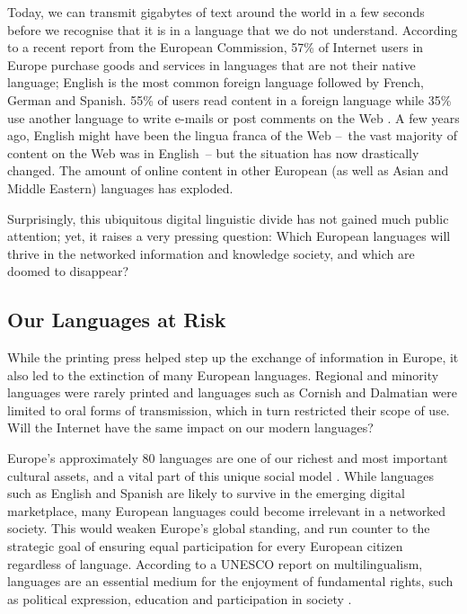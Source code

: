 \documentclass[]{../../metanetpaper}
\begin{document}
\begin{multicols}{2}
Today, we can transmit gigabytes of text around the world in a few seconds before we recognise that it is in a language that we do not understand. According to a recent report from the European Commission, 57\% of Internet users in Europe purchase goods and services in languages that are not their native language; English is the most common foreign language followed by French, German and Spanish. 55\% of users read content in a foreign language while 35\% use another language to write e-mails or post comments on the Web \cite{EC1}. A few years ago, English might have been the lingua franca of the Web --~the vast majority of content on the Web was in English~-- but the situation has now drastically changed. The amount of online content in other European (as well as Asian and Middle Eastern) languages has exploded.

Surprisingly, this ubiquitous digital linguistic divide has not gained much public attention; yet, it raises a very pressing question: Which European languages will thrive in the networked information and knowledge society, and which are doomed to disappear?

\subsection{Our Languages at Risk}

While the printing press helped step up the exchange of information in Europe, it also led to the extinction of many European languages. Regional and minority languages were rarely printed and languages such as Cornish and Dalmatian were limited to oral forms of transmission, which in turn restricted their scope of use. Will the Internet have the same impact on our modern languages?


Europe’s approximately 80 languages are one of our richest and most important cultural assets, and a vital part of this unique social model \cite{EC2}. While languages such as English and Spanish are likely to survive in the emerging digital marketplace, many European languages could become irrelevant in a networked society. This would weaken Europe’s global standing, and run counter to the strategic goal of ensuring equal participation for every European citizen regardless of language. According to a UNESCO report on multilingualism, languages are an essential medium for the enjoyment of fundamental rights, such as political expression, education and participation in society \cite{Unesco1}.


\end{multicols}
\end{document}
